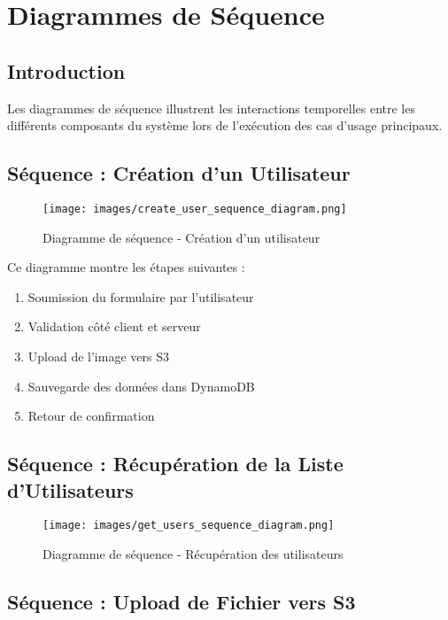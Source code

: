 \section{Diagrammes de Séquence}

\subsection{Introduction}

Les diagrammes de séquence illustrent les interactions temporelles entre les différents composants du système lors de l'exécution des cas d'usage principaux.

\subsection{Séquence : Création d'un Utilisateur}

\begin{figure}[H]
    \centering
    \texttt{[image: images/create\_user\_sequence\_diagram.png]}
    \caption{Diagramme de séquence - Création d'un utilisateur}
    \label{fig:create_user_sequence}
\end{figure}

Ce diagramme montre les étapes suivantes :
\begin{enumerate}
    \item Soumission du formulaire par l'utilisateur
    \item Validation côté client et serveur
    \item Upload de l'image vers S3
    \item Sauvegarde des données dans DynamoDB
    \item Retour de confirmation
\end{enumerate}

\subsection{Séquence : Récupération de la Liste d'Utilisateurs}

\begin{figure}[H]
    \centering
    \texttt{[image: images/get\_users\_sequence\_diagram.png]}
    \caption{Diagramme de séquence - Récupération des utilisateurs}
    \label{fig:get_users_sequence}
\end{figure}

\subsection{Séquence : Upload de Fichier vers S3}

